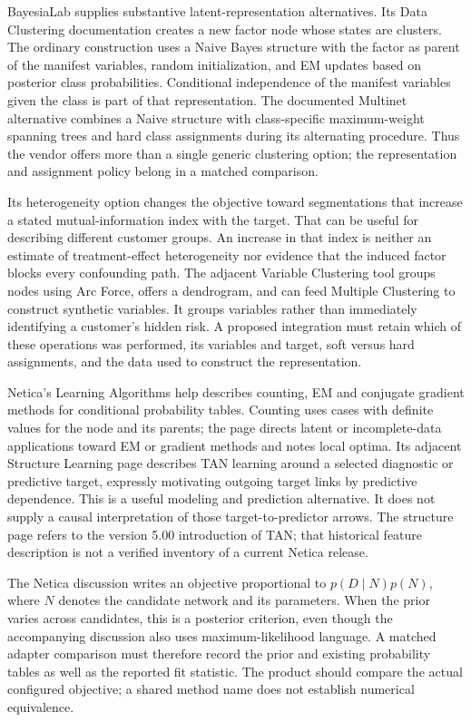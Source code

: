 BayesiaLab supplies substantive latent-representation alternatives. Its
Data Clustering documentation creates a new factor node whose states are
clusters. The ordinary construction uses a Naive Bayes structure with
the factor as parent of the manifest variables, random initialization,
and EM updates based on posterior class probabilities. Conditional
independence of the manifest variables given the class is part of that
representation. The documented Multinet alternative combines a Naive
structure with class-specific maximum-weight spanning trees and hard
class assignments during its alternating procedure. Thus the vendor
offers more than a single generic clustering option; the representation
and assignment policy belong in a matched comparison.
\citep{exec13_latent_bayesia_data}

Its heterogeneity option changes the objective toward segmentations that
increase a stated mutual-information index with the target. That can be
useful for describing different customer groups. An increase in that
index is neither an estimate of treatment-effect heterogeneity nor
evidence that the induced factor blocks every confounding path. The
adjacent Variable Clustering tool groups nodes using Arc Force, offers a
dendrogram, and can feed Multiple Clustering to construct synthetic
variables. It groups variables rather than immediately identifying a
customer's hidden risk. A proposed integration must retain which of
these operations was performed, its variables and target, soft versus
hard assignments, and the data used to construct the representation.
\citep{exec13_latent_bayesia_data,exec13_latent_bayesia_variables}

Netica's Learning Algorithms help describes counting, EM and conjugate
gradient methods for conditional probability tables. Counting uses cases
with definite values for the node and its parents; the page directs
latent or incomplete-data applications toward EM or gradient methods and
notes local optima. Its adjacent Structure Learning page describes TAN
learning around a selected diagnostic or predictive target, expressly
motivating outgoing target links by predictive dependence. This is a
useful modeling and prediction alternative. It does not supply a causal
interpretation of those target-to-predictor arrows. The structure page
refers to the version 5.00 introduction of TAN; that historical feature
description is not a verified inventory of a current Netica release.
\citep{exec13_latent_netica_algorithms,exec13_latent_netica_structure}

The Netica discussion writes an objective proportional to
\(p(D\mid N)p(N)\), where \(N\) denotes the candidate network and its
parameters. When the prior varies across candidates, this is a posterior
criterion, even though the accompanying discussion also uses
maximum-likelihood language. A matched adapter comparison must therefore
record the prior and existing probability tables as well as the reported
fit statistic. The product should compare the actual configured
objective; a shared method name does not establish numerical
equivalence. \citep{exec13_latent_netica_algorithms}


